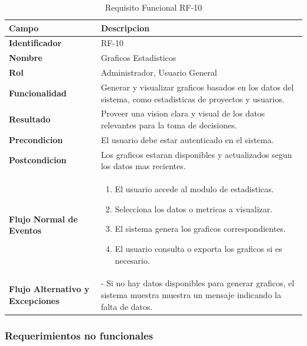 \begin{table}[htb!]
\centering
\caption{Requisito Funcional RF-10}
\begin{tabular}{|p{3cm}|p{12cm}|}
\hline
\textbf{Campo} & \textbf{Descripcion} \\ \hline
\textbf{Identificador} & RF-10 \\ \hline
\textbf{Nombre} & Graficos Estadisticos \\ \hline
\textbf{Rol} & Administrador, Usuario General \\ \hline
\textbf{Funcionalidad} & Generar y visualizar graficos basados en los datos del sistema, como estadisticas de proyectos y usuarios. \\ \hline
\textbf{Resultado} & Proveer una vision clara y visual de los datos relevantes para la toma de decisiones. \\ \hline
\textbf{Precondicion} & El usuario debe estar autenticado en el sistema. \\ \hline
\textbf{Postcondicion} & Los graficos estaran disponibles y actualizados segun los datos mas recientes. \\ \hline
\textbf{Flujo Normal de Eventos} & 
\begin{enumerate}
    \item El usuario accede al modulo de estadisticas. 
    \item Selecciona los datos o metricas a visualizar. 
    \item El sistema genera los graficos correspondientes. 
    \item El usuario consulta o exporta los graficos si es necesario.
\end{enumerate}
\\ \hline
\textbf{Flujo Alternativo y Excepciones} & 
- Si no hay datos disponibles para generar graficos, el sistema muestra muestra un mensaje indicando la falta de datos. \\ \hline
\end{tabular}
\end{table}
\FloatBarrier

\subsubsection{Requerimientos no funcionales}

